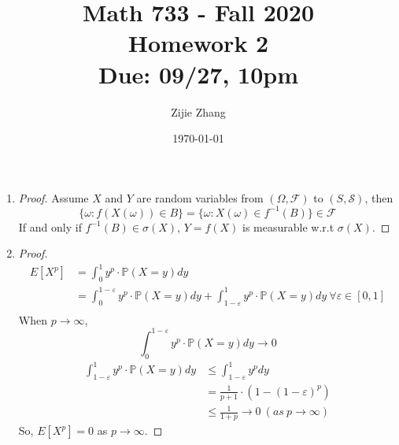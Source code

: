 \documentclass{article}
\title{Math 733 - Fall 2020\\
        {\Large \textbf{Homework 2}}\\
        {\normalsize \textbf{Due: 09/27, 10pm}}
    }
\author{Zijie Zhang}
\date{\today}
\begin{document}
    \maketitle
    \begin{enumerate}
        \item \begin{proof}
            Assume $X$ and $Y$ are random variables from $\left(\Omega, \mathcal{F}\right)$
            to $(S,\mathcal{S})$, then
            $$\{\omega:f\left(X(\omega)\right)\in B\}
            =\{\omega:X(\omega) \in f^{-1}(B)\}
            \in \mathcal{F}$$
            If and only if $f^{-1}(B) \in \sigma(X)$,
            $Y = f(X)$ is measurable w.r.t $\sigma(X)$.
        \end{proof}

        \item \begin{proof}
            \begin{align*}
                E[X^p] &= \int_{0}^{1} y^p \cdot \mathbb{P}(X=y) dy\\
                    &= \int_{0}^{1-\varepsilon} y^p \cdot \mathbb{P}(X=y) dy
                        + \int_{1-\varepsilon}^{1} y^p \cdot \mathbb{P}(X=y) dy
                        \ \forall \varepsilon \in [0,1]\\
            \end{align*}
            When $p\to\infty$,
            $$\int_{0}^{1-\varepsilon} y^p \cdot \mathbb{P}(X=y) dy \to 0$$
            \begin{align*}
                \int_{1-\varepsilon}^{1} y^p \cdot \mathbb{P}(X=y) dy
                &\leqslant \int_{1-\varepsilon}^{1} y^p dy\\
                &=\frac{1}{p+1}\cdot \left(1-(1-\varepsilon)^p\right)\\
                &\leqslant \frac{1}{1+p} \to 0 \ (as \ p\to \infty)
            \end{align*}
            So, $E\left[X^p\right]=0$ as $p\to \infty$.
        \end{proof}


\end{enumerate}
\end{document}
